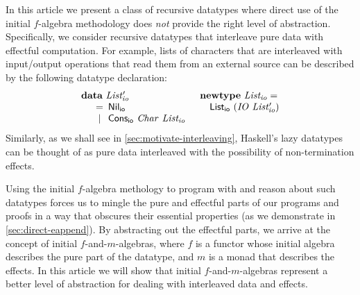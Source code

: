 \documentclass{jfp1}
\newcommand{\kw}[1]{\textbf{#1}}
\begin{document}
In this article we present a class of recursive datatypes where direct
use of the initial $f$-algebra methodology does \emph{not} provide the
right level of abstraction. Specifically, we consider recursive
datatypes that interleave pure data with effectful computation. For
example, lists of characters that are interleaved with input/output
operations that read them from an external source can be described by
the following datatype declaration:
\begin{displaymath}\label{defn:listio}
  \begin{array}{ll}
    \kw{data}~\mathit{List'_{io}}
    &
    \kw{newtype}~\mathit{List_{io}} = 
    \\
    \quad
    \begin{array}[t]{c@{\hspace{0.5em}}l}
      = & \mathsf{Nil_{io}} \\
      | & \mathsf{Cons_{io}}~\mathit{Char}~\mathit{List_{io}} \\
    \end{array}
    &
    \quad \mathsf{List_{io}}~(\mathit{IO}~\mathit{List'_{io}})
  \end{array}
\end{displaymath}
Similarly, as we shall see in \autoref{sec:motivate-interleaving},
Haskell's lazy datatypes can be thought of as pure data interleaved
with the possibility of non-termination effects.

Using the initial $f$-algebra methology to program with and reason
about such datatypes forces us to mingle the pure and effectful parts
of our programs and proofs in a way that obscures their essential
properties (as we demonstrate in \autoref{sec:direct-eappend}). By
abstracting out the effectful parts, we arrive at the concept of
initial $f$-and-$m$-algebras, where $f$ is a functor whose initial
algebra describes the pure part of the datatype, and $m$ is a monad
that describes the effects. In this article we will show that initial
$f$-and-$m$-algebras represent a better level of abstraction for
dealing with interleaved data and effects.
\end{document}
